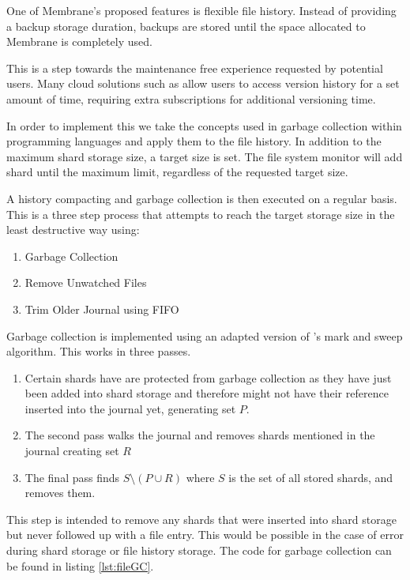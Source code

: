 \documentclass[11pt, a4paper, twocolumn, twoside]{report}
\begin{document}
One of Membrane's proposed features is flexible file history. Instead of providing a backup storage duration, backups are stored until the space allocated to Membrane is completely used.

This is a step towards the maintenance free experience requested by potential users. Many cloud solutions such as \cite{dropbox2017versions} allow users to access version history for a set amount of time, requiring extra subscriptions for additional versioning time.

In order to implement this we take the concepts used in garbage collection within programming languages and apply them to the file history. In addition to the maximum shard storage size, a target size is set. The file system monitor will add shard until the maximum limit, regardless of the requested target size.

A history compacting and garbage collection is then executed on a regular basis. This is a three step process that attempts to reach the target storage size in the least destructive way using:

\begin{enumerate}
 \item Garbage Collection
 \item Remove Unwatched Files
 \item Trim Older Journal using FIFO
\end{enumerate}

Garbage collection is implemented using an adapted version of \cite{dijkstra1978fly}'s mark and sweep algorithm. This works in three passes. 

\begin{enumerate}
 \item Certain shards have are protected from garbage collection as they have just been added into shard storage and therefore might not have their reference inserted into the journal yet, generating set $P$.
 \item The second pass walks the journal and removes shards mentioned in the journal creating set $R$
 \item The final pass finds $S \setminus (P \cup R)$ where $S$ is the set of all stored shards, and removes them.
\end{enumerate}

This step is intended to remove any shards that were inserted into shard storage but never followed up with a file entry. This would be possible in the case of error during shard storage or file history storage. The code for garbage collection can be found in listing \ref{lst:fileGC}.
\end{document}
